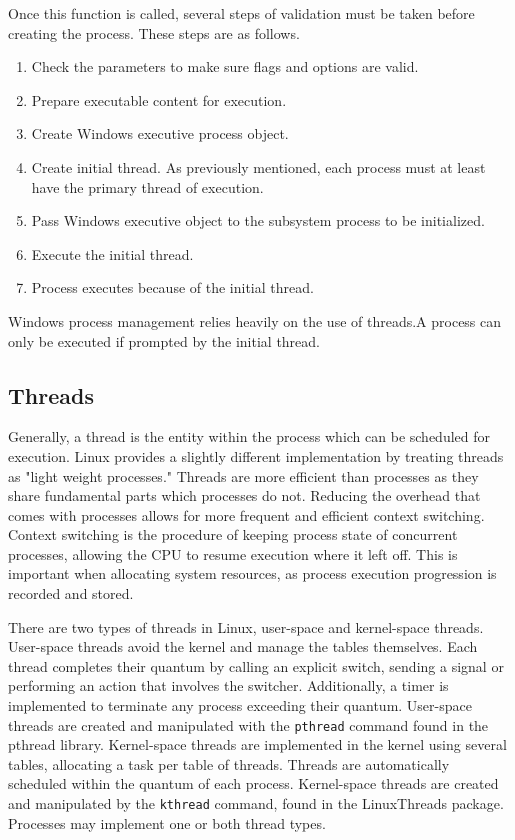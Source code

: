 \documentclass[10pt, onecolumn]{IEEEtran}
\begin{document}
        Once this function is called, several steps of validation must be taken before creating the process. These steps are as follows.
        
        \begin{enumerate}
            \item Check the parameters to make sure flags and options are valid.
            \item Prepare executable content for execution.
            \item Create Windows executive process object.
            \item Create initial thread. As previously mentioned, each process must at least have the primary thread of execution.
            \item Pass Windows executive object to the subsystem process to be initialized.
            \item Execute the initial thread.
            \item Process executes because of the initial thread.
        \end{enumerate}
        
        Windows process management relies heavily on the use of threads.A process can only be executed if prompted by the initial thread.
        
        
        
    \subsection*{Threads}
        Generally, a thread is the entity within the process which can be scheduled for execution. Linux provides a slightly different implementation by treating threads as "light weight processes." Threads are more efficient than processes as they share fundamental parts which processes do not. Reducing the overhead that comes with processes allows for more frequent and efficient context switching. Context switching is the procedure of keeping process state of concurrent processes, allowing the CPU to resume execution where it left off. This is important when allocating system resources, as process execution progression is recorded and stored. 
        
        \vspace{3mm}
        
        There are two types of threads in Linux, user-space and kernel-space threads. User-space threads avoid the kernel and manage the tables themselves. Each thread completes their quantum by calling an explicit switch, sending a signal or performing an action that involves the switcher. Additionally, a timer is implemented to terminate any process exceeding their quantum. User-space threads are created and manipulated with the \texttt{pthread} command found in the pthread library. Kernel-space threads are implemented in the kernel using several tables, allocating a task per table of threads. Threads are automatically scheduled within the quantum of each process. Kernel-space threads are created and manipulated by the \texttt{kthread} command, found in the LinuxThreads package. Processes may implement one or both thread types.
        
\end{document}
